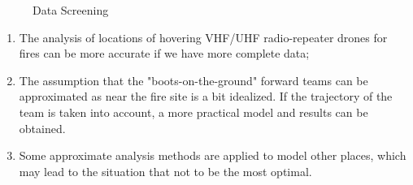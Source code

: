 \documentclass[12pt]{article}  %
\begin{document}
\begin{figure}[htbp]
    \centering    
	\caption{Data Screening} %
\end{figure}

\begin{enumerate}[\bfseries 1.]
    \setlength{\parsep}{0ex} %
    \setlength{\topsep}{0ex} %
    \setlength{\itemsep}{0ex} %
    \item The analysis of locations of hovering VHF/UHF radio-repeater drones for fires can be more accurate if we have more complete data;
    \item The assumption that the "boots-on-the-ground" forward teams can be approximated as near the fire site is a bit idealized. If the trajectory of the team is taken into account, a more practical model and results can be obtained.
    \item Some approximate analysis methods are applied to model other places, which may lead to the situation that not to be the most optimal.
\end{enumerate}
\end{document}
